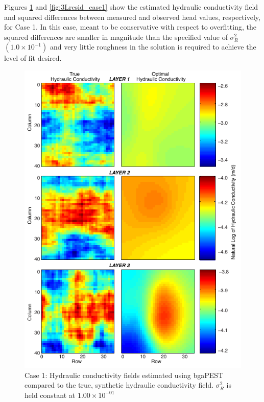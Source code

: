 \documentclass[11pt,oneside,onecolumn]{usgsreport}
\begin{document}
\begin{appendix}
\begin{table}[!t]
\end{table}


Figures \ref{fig:3LK_case1} and \ref{fig:3Lresid_case1} show the
estimated hydraulic conductivity field and squared differences between
measured and observed head values, respectively, for Case 1. In this
case, meant to be conservative with respect to overfitting, the squared
differences are smaller in magnitude than the specified value of $\sigma_{R}^{2}$
$\left(1.0\times10^{-1}\right)$ and very little roughness in the
solution is required to achieve the level of fit desired.

\clearpage

\begin{figure}[!t]
\begin{center}\includegraphics{figures/3KL_case1}\end{center}

\caption{\label{fig:3LK_case1}Case 1: Hydraulic conductivity fields estimated
using bgaPEST compared to the true, synthetic hydraulic conductivity
field. $\sigma_{R}^{2}$ is held constant at $1.00\times10^{-01}$}
\end{figure}



\end{appendix}
\end{document}

